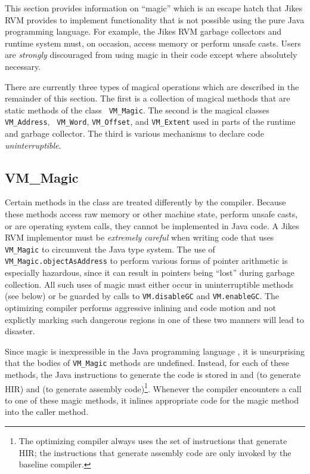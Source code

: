 This section provides information on ``magic'' which is an escape
hatch that Jikes\TMweb{} RVM provides to implement
functionality that is not 
possible using the pure Java\TMweb{} programming language.  For example, the Jikes RVM garbage
collectors and 
runtime system must, on occasion, access memory or perform unsafe
casts.  Users are {\it strongly} discouraged from using magic in their code
except where absolutely necessary.  

There are currently three types of magical operations which are
described in the remainder of this section.  The first is a collection
of magical methods that are static methods of the class {\tt
VM\_Magic}.  The second is the magical classes {\tt VM\_Address}, {\tt
VM\_Word}, {\tt VM\_Offset}, and  {\tt VM\_Extent} used in
parts of the runtime and garbage collector. The third is various
mechanisms to declare code {\em uninterruptible}.

\subsection{VM\_Magic}
Certain methods in the class  are
treated differently by the compiler. Because these methods access raw
memory or other machine state, perform unsafe casts, or are operating
system calls, they cannot be implemented in Java code.  A
Jikes\TMweb{} RVM implementor must be {\em extremely careful} when
writing code that uses {\tt VM\_Magic} to circumvent the Java type
system.  The use of {\tt VM\_Magic.objectAsAddress} to perform various
forms of pointer arithmetic is especially hazardous, since it can
result in pointers being ``lost'' during garbage collection.  All such
uses of magic must either occur in uninterruptible methods (see below)
or be guarded by calls to {\tt VM.disableGC} and {\tt VM.enableGC}.
The optimizing compiler performs aggressive inlining and code motion
and not explictly marking such dangerous regions in one of these two
manners will lead to disaster.

Since magic is inexpressible in the Java programming language , it is
unsurprising that the bodies of {\tt VM\_Magic} methods are undefined.
Instead, for each of these methods, the Java instructions to generate
the code is stored in
 and 
 (to generate HIR) and 
 (to generate assembly code)\footnote{The optimizing
compiler always uses the set of instructions that generate HIR; the
instructions that generate assembly code are only invoked by the
baseline compiler.}.  Whenever the compiler encounters a call to one of these
magic methods, it inlines appropriate code for the magic method into the caller method.


